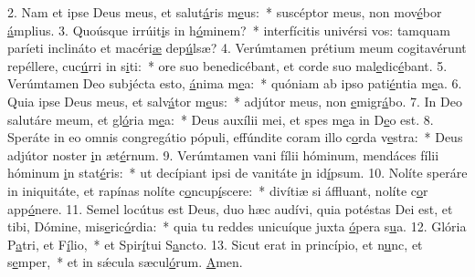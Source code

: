 2. Nam et ipse Deus meus, et salut\uline{á}ris m\uline{e}us:~* suscéptor meus, non mov\uline{é}bor \uline{á}mplius.
3. Quoúsque irrúit\uline{i}s in h\uline{ó}minem?~* interfícitis univérsi vos: tamquam paríeti inclináto et macéri\uline{æ} dep\uline{ú}lsæ?
4. Verúmtamen prétium meum cogitavérunt repéllere, cuc\uline{ú}rri in s\uline{i}ti:~* ore suo benedicébant, et corde suo mal\uline{e}dic\uline{é}bant.
5. Verúmtamen Deo subjécta esto, \uline{á}nima m\uline{e}a:~* quóniam ab ipso pati\uline{é}ntia m\uline{e}a.
6. Quia ipse Deus meus, et salv\uline{á}tor m\uline{e}us:~* adjútor meus, non \uline{e}migr\uline{á}bo.
7. In Deo salutáre meum, et gl\uline{ó}ria m\uline{e}a:~* Deus auxílii mei, et spes m\uline{e}a in D\uline{e}o est.
8. Speráte in eo omnis congregátio pópuli, effúndite coram illo c\uline{o}rda v\uline{e}stra:~* Deus adjútor noster \uline{i}n æt\uline{é}rnum.
9. Verúmtamen vani fílii hóminum, mendáces fílii hóminum \uline{i}n stat\uline{é}ris:~* ut decípiant ipsi de vanitáte \uline{i}n id\uline{í}psum.
10. Nolíte speráre in iniquitáte, et rapínas nolíte c\uline{o}ncup\uline{í}scere:~* divítiæ si áffluant, nolíte c\uline{o}r app\uline{ó}nere.
11. Semel locútus est Deus, duo hæc audívi, quia potéstas Dei est, et tibi, Dómine, mis\uline{e}ric\uline{ó}rdia:~* quia tu reddes unicuíque juxta \uline{ó}pera s\uline{u}a.
12. Glória P\uline{a}tri, et F\uline{í}lio,~* et Spir\uline{í}tui S\uline{a}ncto.
13. Sicut erat in princípio, et n\uline{u}nc, et s\uline{e}mper,~* et in sǽcula sæcul\uline{ó}rum. \uline{A}men.
